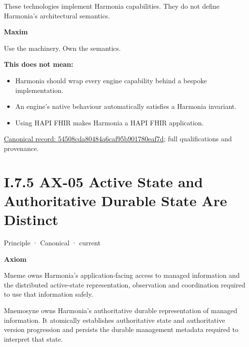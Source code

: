 These technologies implement Harmonia capabilities. They do not define
Harmonia's architectural semantics.



\par\medskip\textbf{Maxim}\par


Use the machinery. Own the semantics.



\textbf{This does not mean:}



\begin{itemize}


\item Harmonia should wrap every engine capability behind a bespoke implementation.

\item An engine's native behaviour automatically satisfies a Harmonia invariant.

\item Using HAPI FHIR makes Harmonia a HAPI FHIR application.

\end{itemize}

{\footnotesize \href{../../../../continuum/motivation/principle/54508cda80484a6caf95b901780eaf7d.md}{Canonical record: 54508cda80484a6caf95b901780eaf7d}; full qualifications and provenance.}\par
\section*{I.7.5 AX-05 Active State and Authoritative Durable State Are Distinct}
\label{navigation:I.7.5}

\label{element:0412a2084f0145babc4f022c71fea65f}
{\small Principle · Canonical · current}\par

\par\medskip\textbf{Axiom}\par


Mneme owns Harmonia's application-facing access to managed information
and the distributed active-state representation, observation and
coordination required to use that information safely.



Mnemosyne owns Harmonia's authoritative durable representation of
managed information. It atomically establishes authoritative state and
authoritative version progression and persists the durable management
metadata required to interpret that state.



